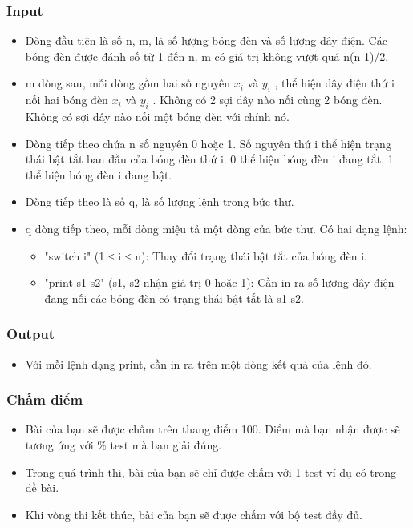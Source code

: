 \subsubsection{Input}
\begin{itemize}
	\item Dòng đầu tiên là số n, m, là số lượng bóng đèn và số lượng dây điện. Các bóng đèn được đánh số từ 1 đến n. m có giá trị không vượt quá n(n-1)/2.
	\item m dòng sau, mỗi dòng gồm hai số nguyên $x_{i}$ và $y_{i}$ , thể hiện dây điện thứ i nối hai bóng đèn $x_{i}$ và $y_{i}$ . Không có 2 sợi dây nào nối cùng 2 bóng đèn. Không có sợi dây nào nối một bóng đèn với chính nó.
	\item Dòng tiếp theo chứa n số nguyên 0 hoặc 1. Số nguyên thứ i thể hiện trạng thái bật tắt ban đầu của bóng đèn thứ i. 0 thể hiện bóng đèn i đang tắt, 1 thể hiện bóng đèn i đang bật.
	\item Dòng tiếp theo là số q, là số lượng lệnh trong bức thư.
	\item q dòng tiếp theo, mỗi dòng miệu tả một dòng của bức thư. Có hai dạng lệnh:
\begin{itemize}
	\item "switch i" (1 ≤ i ≤ n): Thay đổi trạng thái bật tắt của bóng đèn i.
	\item "print s1 s2" (s1, s2 nhận giá trị 0 hoặc 1): Cần in ra số lượng dây điện đang nối các bóng đèn có trạng thái bật tắt là s1 s2.
\end{itemize}
\end{itemize}

\subsubsection{Output}
\begin{itemize}
	\item Với mỗi lệnh dạng print, cần in ra trên một dòng kết quả của lệnh đó.
\end{itemize}

\subsubsection{Chấm điểm}
\begin{itemize}
	\item Bài của bạn sẽ được chấm trên thang điểm 100. Điểm mà bạn nhận được sẽ tương ứng với \% test mà bạn giải đúng.
	\item Trong quá trình thi, bài của bạn sẽ chỉ được chấm với 1 test ví dụ có trong đề bài.
	\item Khi vòng thi kết thúc, bài của bạn sẽ được chấm với bộ test đầy đủ.
\end{itemize}

